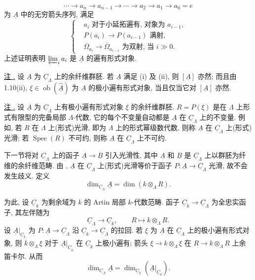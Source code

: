 \[
 \cdots\longrightarrow a_n\longrightarrow a_{n-1}
 \longrightarrow\cdots\longrightarrow a_2\longrightarrow a_1
 \longrightarrow a_0=e
\]
为 $\underline A$ 中的无穷箭头序列, 满足
\[
\left\{
\begin{aligned}
&a_i\text{ 对于小延拓遍有, 对象为 }a_{i-1},\\
&P(a_i)\longrightarrow P(a_{i-1})\text{ 满射},\\
&\overline\Omega_{a_i}\longrightarrow
 \overline\Omega_{a_{i-1}}\text{ 为双射, 当 }i\gg0.
\end{aligned}
\right.
\]
上述证明表明 $\varprojlim_i a_i$ 是 $\underline A$ 的遍有形式对象.

\underline{注 .}
设 $\underline A$ 为 $\underline C_\Lambda$ 上的余纤维群胚.
若 $\underline A$ 满足 (i) 及 (ii),
则 $[\underline A]$ 亦然; 而且由 1.10(ii),
$\xi\in\operatorname{ob}(\widehat{\underline A})$ 为 $\underline A$
的极小遍有形式对象, 当且仅当它对 $[\underline A]$ 亦然.

\underline{注 .}
设 $\underline A$ 为 $\underline C_\Lambda$ 上有极小遍有形式对象 $\xi$
的余纤维群胚. $R=P(\xi)$ 是在 $\Lambda$ 上形式有限型的完备局部
$\Lambda$-代数, 它的每个不变量自动都是 $\underline A$
在 $\underline C_\Lambda$ 上的不变量.
例如, 若 $R$ 在 $\Lambda$ 上(形式)光滑, 即为 $\Lambda$ 上的形式幂级数代数,
则称 $\underline A$ 在 $\underline C_\Lambda$ 上(形式)光滑;
若 $\operatorname{Spec}(R)$ 不可约, 则称 $\underline A$
在 $\underline C_\Lambda$ 上不可约.

下一节将对 $\underline C_\Lambda$ 上的函子
$\underline A\longrightarrow\underline B$ 引入光滑性,
其中 $\underline A$ 和 $\underline B$ 是 $\underline C_\Lambda$
上以群胚为纤维的余纤维范畴.
由 , $\underline A$
在 $\underline C_\Lambda$ 上(形式)光滑等价于函子
$P:\underline A\longrightarrow\underline C_\Lambda$ 光滑, 故不会发生歧义.
定义
\[
 \dim_{\underline C_\Lambda}\underline A
   =\dim(k\otimes_\Lambda R).
\]

为此, 设 $\underline C_k$ 为剩余域为 $k$ 的 Artin 局部 $k$-代数范畴.
函子 $\underline C_k\longrightarrow\underline C_\Lambda$ 为全忠实函子,
其左伴随为
\[
 \underline C_\Lambda\longrightarrow\underline C_k,
 \qquad R\longmapsto k\otimes_\Lambda R.
\]
设 $\underline A|_{\underline C_k}$ 为
$P:\underline A\longrightarrow\underline C_\Lambda$
沿 $\underline C_k\longrightarrow\underline C_\Lambda$ 的拉回.
若 $\xi$ 为 $\underline A$ 在 $\underline C_\Lambda$ 上的极小遍有形式对象,
则 $k\otimes_\Lambda\xi$ 对于 $\underline A|_{\underline C_k}$
在 $\underline C_k$ 上极小遍有;
箭头 $\xi\longrightarrow k\otimes_\Lambda\xi$
在 $R\longrightarrow k\otimes_\Lambda R$ 上余笛卡尔. 从而
\[
 \dim_{\underline C_\Lambda}\underline A
 =\dim_{\underline C_k}(\underline A|_{\underline C_k}).
\]

